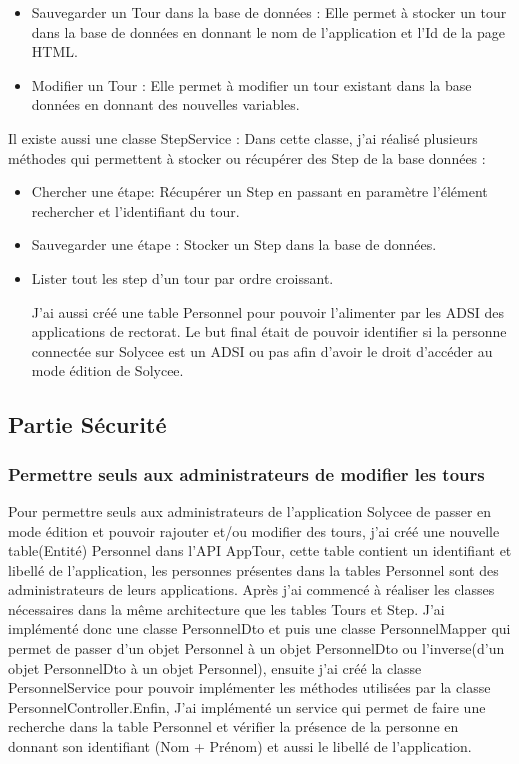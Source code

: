 \documentclass[12pt]{article}
\begin{document}
\begin{itemize}
\begin{itemize}
\item Sauvegarder un Tour dans la base de données : Elle permet à stocker un tour dans la base de données en donnant le nom de l'application et l'Id de la page HTML. 

\item Modifier un Tour : Elle permet à modifier un tour existant dans la base données en donnant des nouvelles variables. 
\end{itemize}

Il existe aussi une classe StepService : Dans cette classe, j'ai réalisé plusieurs méthodes qui permettent à stocker ou récupérer des Step de la base données : 
\begin{itemize}

\item  Chercher une étape: Récupérer un Step en passant en paramètre l'élément rechercher et l'identifiant du tour.

\item Sauvegarder une étape : Stocker un Step dans la base de données.

\item Lister tout les step d'un tour par ordre croissant.  


J'ai aussi créé une table Personnel pour pouvoir l'alimenter par les ADSI des applications de rectorat. Le but final était de pouvoir identifier si la personne connectée sur Solycee est un ADSI ou pas afin d'avoir le droit d'accéder au mode édition de Solycee. 

\end{itemize}
\end{itemize}
\subsection{Partie Sécurité}
\subsubsection{Permettre seuls aux administrateurs de modifier les tours}

Pour permettre seuls aux administrateurs de l'application Solycee de passer en mode édition  et pouvoir rajouter et/ou modifier des tours, j'ai créé une nouvelle table(Entité) Personnel dans l'API AppTour, cette table contient un identifiant et libellé de l'application, les personnes présentes dans la tables Personnel sont des administrateurs de leurs applications. Après j'ai commencé à réaliser les classes nécessaires dans la même architecture que les tables Tours et Step. J'ai implémenté donc une classe PersonnelDto et puis une classe PersonnelMapper qui permet de passer d'un objet Personnel à un objet PersonnelDto ou l'inverse(d'un objet PersonnelDto à un objet Personnel), ensuite j'ai créé la classe PersonnelService pour pouvoir implémenter les méthodes utilisées par la classe PersonnelController.Enfin, J'ai implémenté un service qui permet de faire une recherche dans la table Personnel et vérifier la présence de la personne en donnant son identifiant (Nom + Prénom) et aussi le libellé de l'application. 
\end{document}
